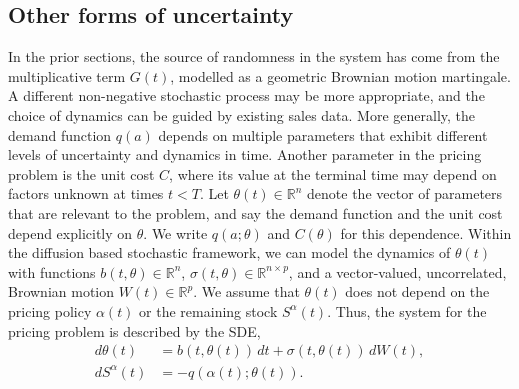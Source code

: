 \documentclass[main.tex]{subfiles}
\begin{document}
\subsection{Other forms of uncertainty}
In the prior sections, the source of randomness in the system has come from
the multiplicative term $G(t)$, modelled as a geometric Brownian
motion martingale. A different non-negative stochastic process may be more appropriate, and the
choice of dynamics can be guided by existing sales data.
More generally, the demand function $q(a)$ depends on multiple
parameters that exhibit different levels of
uncertainty and dynamics in time. Another parameter in the pricing
problem is the unit cost $C$, where its value at the terminal time may
depend on factors unknown at times $t<T$.
Let $\theta(t)\in\mathbb{R}^n$ denote the vector of parameters that are
relevant to the problem, and say the demand function  and the unit cost
depend explicitly on $\theta$. We write $q(a;\theta)$ and $C(\theta)$
for this dependence.
Within the diffusion based stochastic framework, we can model the
dynamics of $\theta(t)$ with functions $b(t,\theta)\in\mathbb{R}^n$,
$\sigma(t,\theta)\in\mathbb{R}^{n\times p}$, and a vector-valued, uncorrelated,
Brownian motion $W(t)\in\mathbb{R}^p$.
We assume that $\theta(t)$ does not depend on the pricing policy
$\alpha(t)$ or the remaining
stock $S^\alpha(t)$. Thus,
the system for the pricing problem is described by the SDE,
\begin{align}
  d\theta(t)&=b(t,\theta(t))\,dt + \sigma(t,\theta(t))\,dW(t),\\
  dS^\alpha(t)&=-q(\alpha(t);\theta(t)).
\end{align}
\end{document}
